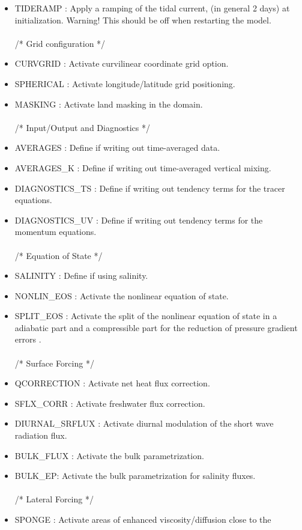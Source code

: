\begin{itemize}
\item TIDERAMP  :  Apply a ramping of the tidal current, (in general 2 days) at initialization.
Warning! This should be off when restarting the model.
\\ \\ /*                       Grid configuration */
\item CURVGRID : Activate curvilinear coordinate grid option.
\item SPHERICAL : Activate longitude/latitude grid positioning.
\item MASKING : Activate land masking in the domain.
\\ \\ /*                       Input/Output and Diagnostics */
\item AVERAGES : Define if writing out time-averaged data.
\item AVERAGES\_K : Define if writing out time-averaged vertical mixing.
\item DIAGNOSTICS\_TS  : Define if writing out tendency terms for the tracer equations.
\item DIAGNOSTICS\_UV  : Define if writing out tendency terms for the momentum equations.
\\ \\ /*                       Equation of State */
\item SALINITY : Define if using salinity.
\item NONLIN\_EOS : Activate the nonlinear equation of state.
\item SPLIT\_EOS : Activate the split of the nonlinear equation of state in a
adiabatic part and a compressible part for the reduction of pressure gradient errors
\citep{Shc03a}.
\\ \\ /*                       Surface Forcing */
\item QCORRECTION : Activate net heat flux correction.
\item SFLX\_CORR : Activate freshwater flux correction.
\item DIURNAL\_SRFLUX : Activate diurnal modulation of the short wave radiation flux.
\item BULK\_FLUX : Activate the bulk parametrization.
\item BULK\_EP: Activate the bulk parametrization for salinity fluxes.
\\ \\ /*                       Lateral Forcing */
\item SPONGE : Activate areas of enhanced viscosity/diffusion close to the 

\end{itemize}
